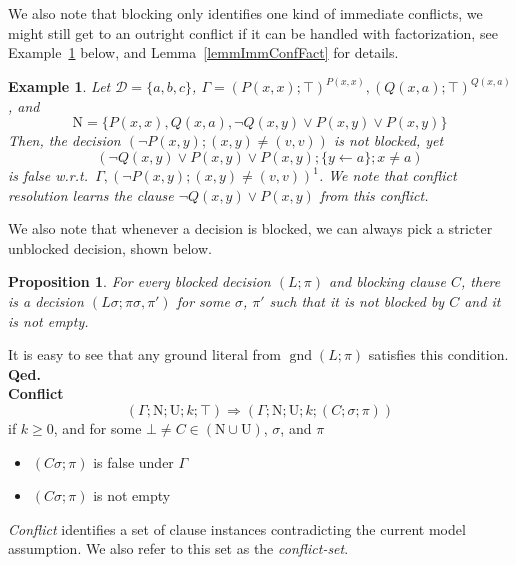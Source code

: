 \documentclass[a4paper]{article}
\newcommand{\mGnd}{\operatorname{gnd}} \newcommand{\mLVar}{\operatorname{lvar}} \newcommand{\mRVar}{\operatorname{rvar}} \newcommand{\mDmn}{\operatorname{dom}} \newcommand{\mRng}{\operatorname{rng}} \newcommand{\mMGU}{\operatorname{mgu}} \newcommand{\mDef}{\operatorname{def}} \newcommand{\mDomain}{\mathcal{D}} \newcommand{\mVar}{\operatorname{var}}
\newcommand{\startproof}{{\bf Proof:~}}
\newcommand{\finishproof}{{\bf Qed.}}
\newcommand{\leaveabit}{\\[6 pt]}
\newtheorem{prop}[defi]{Proposition}
\newtheorem{example}[defi]{Example}
\begin{document}
We also note that blocking only identifies one kind of immediate conflicts, we might still get to an 
outright conflict if it can be handled with factorization, see Example~\ref{exImmConf} below, and Lemma~\ref{lemmImmConfFact} for details.



\begin{example}\label{exImmConf}
Let $\mDomain = \{a, b, c\}$, $\Gamma = (P(x,x); \top)^{P(x,x)}, (Q(x,a); \top)^{Q(x,a)}$, and 
\[\text{N} = \{P(x,x), Q(x,a), \neg Q(x,y) \lor P(x,y) \lor P(x,y) \}\]
Then, the decision $(\neg P(x,y); (x,y) \ne (v,v))$ is not blocked, yet 
\[(\neg Q(x,y) \lor P(x,y) \lor P(x,y); \{y \gets a\}; x \ne a)\]
is false w.r.t.\
$\Gamma, (\neg P(x,y); (x,y) \ne (v,v))^1$.
We note that conflict resolution learns the clause $\neg Q(x,y) \lor P(x,y)$ from this conflict.
\end{example}
\noindent
We also note that whenever a decision is blocked, we can always pick a stricter unblocked decision, shown below.
\begin{prop}
For every blocked decision $(L; \pi)$ and blocking clause $C$, 
there is a decision $(L\sigma; \pi\sigma, \pi')$ for some $\sigma$, $\pi'$ such that 
it is not blocked by $C$ and it is not empty. 
\end{prop}
\noindent\startproof
It is easy to see that any ground literal from $\mGnd(L; \pi)$ satisfies this condition.
\finishproof\leaveabit
\textbf{Conflict}
\[(\Gamma; \text{N}; \text{U}; k; \top) \Rightarrow
    (\Gamma; \text{N}; \text{U}; k; (C; \sigma; \pi))\]
if $k \geq 0$, and for some $\bot \ne C \in (\text{N} \cup \text{U})$, $\sigma$, and $\pi$
\begin{itemize}
	\item $(C\sigma; \pi)$ is false under $\Gamma$
	\item $(C\sigma; \pi)$ is not empty
\end{itemize}
\emph{Conflict} identifies a set of clause instances contradicting the current model assumption. 
We also refer to this set as the \emph{conflict-set}.
\end{document}
